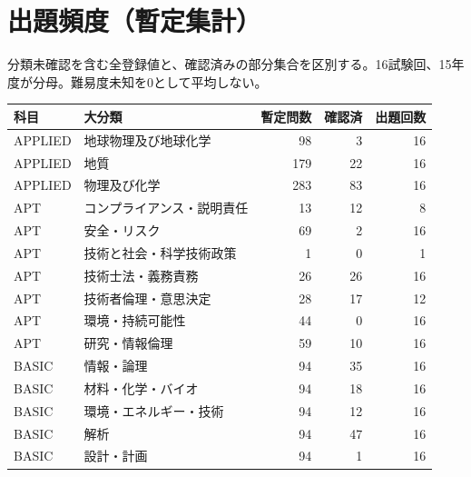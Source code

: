 \chapter{出題頻度（暫定集計）}
分類未確認を含む全登録値と、確認済みの部分集合を区別する。16試験回、15年度が分母。難易度未知を0として平均しない。
\begin{longtable}{p{.16\linewidth}p{.42\linewidth}rrr}
科目 & 大分類 & 暫定問数 & 確認済 & 出題回数\\\hline
APPLIED & 地球物理及び地球化学 & 98 & 3 & 16\\
APPLIED & 地質 & 179 & 22 & 16\\
APPLIED & 物理及び化学 & 283 & 83 & 16\\
APT & コンプライアンス・説明責任 & 13 & 12 & 8\\
APT & 安全・リスク & 69 & 2 & 16\\
APT & 技術と社会・科学技術政策 & 1 & 0 & 1\\
APT & 技術士法・義務責務 & 26 & 26 & 16\\
APT & 技術者倫理・意思決定 & 28 & 17 & 12\\
APT & 環境・持続可能性 & 44 & 0 & 16\\
APT & 研究・情報倫理 & 59 & 10 & 16\\
BASIC & 情報・論理 & 94 & 35 & 16\\
BASIC & 材料・化学・バイオ & 94 & 18 & 16\\
BASIC & 環境・エネルギー・技術 & 94 & 12 & 16\\
BASIC & 解析 & 94 & 47 & 16\\
BASIC & 設計・計画 & 94 & 1 & 16\\
\end{longtable}
